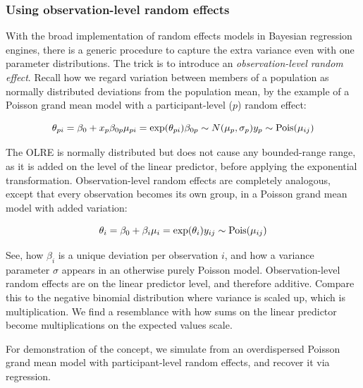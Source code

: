 \documentclass[]{svmono}
\theoremstyle{definition}
\theoremstyle{definition}
\theoremstyle{definition}
\theoremstyle{remark}
\begin{document}
\subsubsection{Using observation-level random
effects}\label{using-observation-level-random-effects}

With the broad implementation of random effects models in Bayesian
regression engines, there is a generic procedure to capture the extra
variance even with one parameter distributions. The trick is to
introduce an \emph{observation-level random effect}. Recall how we
regard variation between members of a population as normally distributed
deviations from the population mean, by the example of a Poisson grand
mean model with a participant-level (\(p\)) random effect:

\[
\theta_{pi} = \beta_0 + x_p\beta_{0p} \\
\mu_{pi} = \exp(\theta_{pi})\\
\beta_{0p} \sim N(\mu_{p}, \sigma_p)\\
y_{p} \sim \textrm{Pois}(\mu_{ij})
\]

The OLRE is normally distributed but does not cause any bounded-range
range, as it is added on the level of the linear predictor, before
applying the exponential transformation. Observation-level random
effects are completely analogous, except that every observation becomes
its own group, in a Poisson grand mean model with added variation:

\[
\theta_{i} = \beta_0 + \beta_{i} \\
\mu_i = \exp(\theta_i)\\
y_{ij} \sim \textrm{Pois}(\mu_{ij})
\]

See, how \(\beta_i\) is a unique deviation per observation \(i\), and
how a variance parameter \(\sigma\) appears in an otherwise purely
Poisson model. Observation-level random effects are on the linear
predictor level, and therefore additive. Compare this to the negative
binomial distribution where variance is scaled up, which is
multiplication. We find a resemblance with how sums on the linear
predictor become multiplications on the expected values scale.

For demonstration of the concept, we simulate from an overdispersed
Poisson grand mean model with participant-level random effects, and
recover it via regression.
\end{document}
